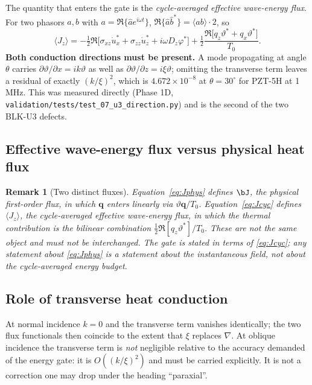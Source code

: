 \documentclass[11pt]{article}
\newcommand{\s}{\sigma}
\newcommand{\bth}{\vartheta}
\newcommand{\bq}{\bm{q}}
\theoremstyle{plain}
\newtheorem{remark}{Remark}
\begin{document}
The quantity that enters the gate is the \emph{cycle-averaged effective
wave-energy flux}. For two phasors $a,b$ with
$a=\Re\{\hat a e^{i\omega t}\}$, $\Re\{\hat a\hat b^*\}
=\langle ab\rangle\cdot 2$, so
\begin{equation}
\langle J_z\rangle
=-\tfrac12\Re\bigl[\s_{xz}\dot u_x^*+\s_{zz}\dot u_z^*
 +i\omega D_z\varphi^*\bigr]
 +\tfrac12\frac{\Re\bigl[q_z\bth^*+q_x\bth^*\bigr]}{T_0}.
\label{eq:Jcyc}
\end{equation}
\textbf{Both conduction directions must be present.} A mode propagating at angle
$\theta$ carries $\partial\bth/\partial x=ik\bth$ as well as
$\partial\bth/\partial z=i\xi\bth$; omitting the transverse term leaves a
residual of exactly $(k/\xi)^2$, which is $4.672\times10^{-8}$ at
$\theta=30^\circ$ for PZT-5H at 1\,MHz. This was measured directly (Phase 1D,
\texttt{validation/tests/test\_07\_u3\_direction.py}) and is the second of the
two BLK-U3 defects.

\subsection{Effective wave-energy flux versus physical heat flux}

\begin{remark}[Two distinct fluxes]
\label{rem:twofluxes}
Equation~\eqref{eq:Jphys} defines $\bJ$, the physical first-order flux, in which
$\bq$ enters linearly via $\bth\bq/T_0$. Equation~\eqref{eq:Jcyc} defines
$\langle J_z\rangle$, the cycle-averaged effective wave-energy flux, in which the
thermal contribution is the \emph{bilinear} combination
$\tfrac12\Re[q_z\bth^*]/T_0$. These are not the same object and must not be
interchanged. The gate is stated in terms of \eqref{eq:Jcyc}; any statement about
\eqref{eq:Jphys} is a statement about the instantaneous field, not about the
cycle-averaged energy budget.
\end{remark}

\subsection{Role of transverse heat conduction}

At normal incidence $k=0$ and the transverse term vanishes identically; the two
flux functionals then coincide to the extent that $\xi$ replaces $\nabla$.
At oblique incidence the transverse term is \emph{not} negligible relative to
the accuracy demanded of the energy gate: it is $O((k/\xi)^2)$ and must be
carried explicitly. It is not a correction one may drop under the heading
``paraxial''.
\end{document}
